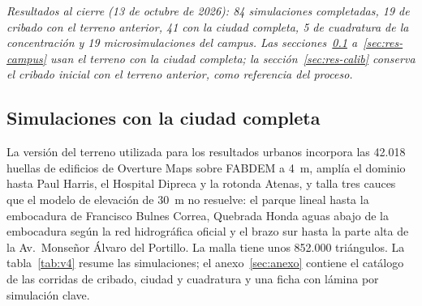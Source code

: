 \emph{Resultados al cierre (13 de octubre de 2026): 84 simulaciones completadas, 19 de cribado con el terreno anterior, 41 con la ciudad completa, 5 de cuadratura de la concentración y 19 microsimulaciones del campus. Las secciones~\ref{sec:res-v4} a~\ref{sec:res-campus} usan el terreno con la ciudad completa; la sección~\ref{sec:res-calib} conserva el cribado inicial con el terreno anterior, como referencia del proceso.}

\subsection{Simulaciones con la ciudad completa}\label{sec:res-v4}
La versión del terreno utilizada para los resultados urbanos incorpora las 42.018 huellas de edificios de Overture Maps sobre FABDEM a \SI{4}{m}, amplía el dominio hasta Paul Harris, el Hospital Dipreca y la rotonda Atenas, y talla tres cauces que el modelo de elevación de \SI{30}{m} no resuelve: el parque lineal hasta la embocadura de Francisco Bulnes Correa, Quebrada Honda aguas abajo de la embocadura según la red hidrográfica oficial y el brazo sur hasta la parte alta de la Av.\ Monseñor Álvaro del Portillo. La malla tiene unos 852.000 triángulos. La tabla~\ref{tab:v4} resume las simulaciones; el anexo~\ref{sec:anexo} contiene el catálogo de las corridas de cribado, ciudad y cuadratura y una ficha con lámina por simulación clave.



